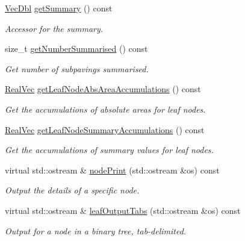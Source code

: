 \begin{DoxyCompactItemize}
\item 
\hyperlink{namespacesubpavings_a6b4d2e61b2f0b65cacc9c9322d89bc37}{\-Vec\-Dbl} \hyperlink{classsubpavings_1_1CollatorSPnode_aecf22d39cbb7289355a08cec62749800}{get\-Summary} () const 
\begin{DoxyCompactList}\small\item\em \-Accessor for the summary. \end{DoxyCompactList}\item 
size\-\_\-t \hyperlink{classsubpavings_1_1CollatorSPnode_a6470a98dd502247ca9e86582b3c422eb}{get\-Number\-Summarised} () const 
\begin{DoxyCompactList}\small\item\em \-Get number of subpavings summarised. \end{DoxyCompactList}\item 
\hyperlink{namespacesubpavings_af2d57bb6e12f4a73169f2e496d6a641f}{\-Real\-Vec} \hyperlink{classsubpavings_1_1CollatorSPnode_ac0b072587e955a451fab739dcb538c37}{get\-Leaf\-Node\-Abs\-Area\-Accumulations} () const 
\begin{DoxyCompactList}\small\item\em \-Get the accumulations of absolute areas for leaf nodes. \end{DoxyCompactList}\item 
\hyperlink{namespacesubpavings_af2d57bb6e12f4a73169f2e496d6a641f}{\-Real\-Vec} \hyperlink{classsubpavings_1_1CollatorSPnode_a8c566a24d35898fb54133cf310276468}{get\-Leaf\-Node\-Summary\-Accumulations} () const 
\begin{DoxyCompactList}\small\item\em \-Get the accumulations of summary values for leaf nodes. \end{DoxyCompactList}\item 
virtual std\-::ostream \& \hyperlink{classsubpavings_1_1CollatorSPnode_ab58b8d4c3a8a879930da943dbe2dd62d}{node\-Print} (std\-::ostream \&os) const 
\begin{DoxyCompactList}\small\item\em \-Output the details of a specific node. \end{DoxyCompactList}\item 
virtual std\-::ostream \& \hyperlink{classsubpavings_1_1CollatorSPnode_ab2e1cd11ef3dd4424cf491e529ed0fd8}{leaf\-Output\-Tabs} (std\-::ostream \&os) const 
\begin{DoxyCompactList}\small\item\em \-Output for a node in a binary tree, tab-\/delimited. \end{DoxyCompactList}\item 

\end{DoxyCompactItemize}
